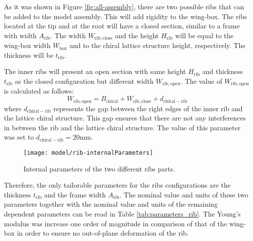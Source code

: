 As it was shown in Figure \ref{fig:all-assembly}, there are two possible ribs that can be added to the model assembly. This will add rigidity to the wing-box. The ribs located at the tip and at the root will have a closed section, similar to a frame with width $A_{\mathrm{rib}}$. The width $W_{\mathrm{rib,close}}$ and the height $H_{\mathrm{rib}}$ will be equal to the wing-box width $W_{\mathrm{box}}$ and to the chiral lattice structure height, respectively. The thickness will be $t_{\mathrm{rib}}$.

The inner ribs will present an open section with same height $H_{\mathrm{rib}}$ and thickness $t_{\mathrm{rib}}$ as the closed configuration but different width $W_{\mathrm{rib,open}}$. The value of $W_{\mathrm{rib,open}}$ is calculated as follows:
$$
W_{\mathrm{rib,open}} = B_{\mathrm{chiral}} + W_{\mathrm{rib,close}} + d_{\mathrm{chiral-rib}}
$$
where $d_{\mathrm{chiral-rib}}$ represents the gap between the right edges of the inner rib and the lattice chiral structure. This gap ensures that there are not any interferences in between the rib and the lattice chiral structure. The value of this parameter was set to $d_{\mathrm{chiral-rib}} = 20$mm.

\begin{figure}[!htpb]
  \centering
  \texttt{[image: model/rib-internalParameters]}
  \caption[Internal parameters of the two different ribs parts]{Internal parameters of the two different ribs parts.}\label{fig:rib-internalParameters}
\end{figure}

Therefore, the only tailorable parameters for the ribs configurations are the thickness $t_{\mathrm{rib}}$ and the frame width $A_{\mathrm{rib}}$. The nominal value and units of these two parameters together with the nominal value and units of the remaining dependent parameters can be read in Table \ref{tab:parameters_rib}. The Young's modulus was increase one order of magnitude in comparison of that of the wing-box in order to ensure no out-of-plane deformation of the rib.

